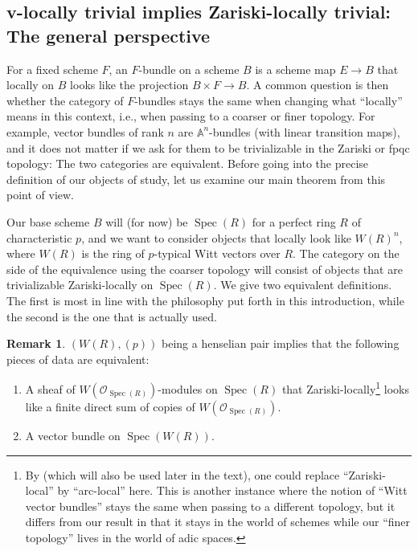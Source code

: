 \documentclass[10pt,twoside]{article}
\numberwithin{equation}{section}
\theoremstyle{plain}
\theoremstyle{definition}
\newtheorem{myrem}[mythm]{Remark}
\DeclareMathOperator{\Spec}{Spec}
\newcommand{\MCO}{\mathcal{O}}
\begin{document}
\subsection*{v-locally trivial implies Zariski-locally trivial: The general perspective}

For a fixed scheme \(F\), an \(F\)-bundle on a scheme \(B\) is a scheme map \(E\to B\) that locally on \(B\) looks like the projection \(B\times F\to B\). A common question is then whether the category of \(F\)-bundles stays the same when changing what ``locally'' means in this context, i.e., when passing to a coarser or finer topology. For example, vector bundles of rank \(n\) are \(\mathbb{A}^n\)-bundles (with linear transition maps), and it does not matter if we ask for them to be trivializable in the Zariski or fpqc topology: The two categories are equivalent. Before going into the precise definition of our objects of study, let us examine our main theorem from this point of view.\par
Our base scheme \(B\) will (for now) be \(\Spec(R)\) for a perfect ring \(R\) of characteristic \(p\), and we want to consider objects that locally look like \(W(R)^{n}\), where \(W(R)\) is the ring of \(p\)-typical Witt vectors over \(R\). The category on the side of the equivalence using the coarser topology will consist of objects that are trivializable Zariski-locally on \(\Spec(R)\). We give two equivalent definitions. The first is most in line with the philosophy put forth in this introduction, while the second is the one that is actually used.

\begin{myrem}
\((W(R),(p))\) being a henselian pair implies that the following pieces of data are equivalent:
    \begin{enumerate}
        \item A sheaf of \(W(\MCO_{\Spec(R)})\)-modules on \(\Spec(R)\) that Zariski-locally\footnote{By \cite{Takaya} (which will also be used later in the text), one could replace ``Zariski-local'' by ``arc-local'' here. This is another instance where the notion of ``Witt vector bundles'' stays the same when passing to a different topology, but it differs from our result in that it stays in the world of schemes while our ``finer topology'' lives in the world of adic spaces.} looks like a finite direct sum of copies of \(W(\MCO_{\Spec(R)})\). 
        \item A vector bundle on \(\Spec(W(R))\).
    \end{enumerate}
\end{myrem}
    
\end{document}
